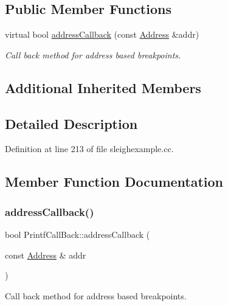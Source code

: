 \subsection*{Public Member Functions}
\begin{DoxyCompactItemize}
\item 
virtual bool \mbox{\hyperlink{class_printf_call_back_a9ff8d8997e91d769c03a4e09ad8373b5}{address\+Callback}} (const \mbox{\hyperlink{class_address}{Address}} \&addr)
\begin{DoxyCompactList}\small\item\em Call back method for address based breakpoints. \end{DoxyCompactList}\end{DoxyCompactItemize}
\subsection*{Additional Inherited Members}


\subsection{Detailed Description}


Definition at line 213 of file sleighexample.\+cc.



\subsection{Member Function Documentation}
\mbox{\label{class_printf_call_back_a9ff8d8997e91d769c03a4e09ad8373b5}} 
\subsubsection{\texorpdfstring{addressCallback()}{addressCallback()}}
{\footnotesize\ttfamily bool Printf\+Call\+Back\+::address\+Callback (\begin{DoxyParamCaption}\item[{const \mbox{\hyperlink{class_address}{Address}} \&}]{addr }\end{DoxyParamCaption})\hspace{0.3cm}{\ttfamily [virtual]}}



Call back method for address based breakpoints. 

